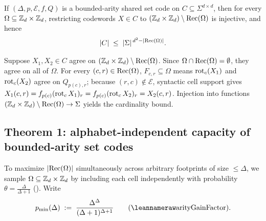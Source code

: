 \begin{lemma}\label{lem:one-hop-injective}
If $(\Delta, p, \mathcal{E}, f, Q)$ is a bounded-arity shared set code on $C \subseteq
\Sigma^{d\times d}$, then for every $\Omega \subseteq \mathbb{Z}_d \times \mathbb{Z}_d$, restricting codewords
$X \in C$ to $(\mathbb{Z}_d \times \mathbb{Z}_d) \setminus \operatorname{Rec}(\Omega)$ is injective, and hence
\[
  \lvert C \rvert \;\le\; \lvert \Sigma \rvert^{\,d^2 - \lvert \operatorname{Rec}(\Omega) \rvert}.
\]
\end{lemma}
\begin{outline}
Suppose $X_1, X_2 \in C$ agree on $(\mathbb{Z}_d \times \mathbb{Z}_d) \setminus \operatorname{Rec}(\Omega)$. Since
$\Omega \cap \operatorname{Rec}(\Omega) = \emptyset$, they agree on all of $\Omega$. For every $(c,r) \in
\operatorname{Rec}(\Omega)$, $F_{c,r} \subseteq \Omega$ means $\operatorname{rot}_c(X_1)$ and $\operatorname{rot}_c(X_2)$ agree on
$Q_{p(c),r}$; because $(r,c) \notin \mathcal{E}$, syntactic cell support gives
$X_1(c,r) = f_{p(c)}(\operatorname{rot}_c X_1)_r = f_{p(c)}(\operatorname{rot}_c X_2)_r = X_2(c,r)$. Injection into functions
$(\mathbb{Z}_d \times \mathbb{Z}_d) \setminus \operatorname{Rec}(\Omega) \to \Sigma$ yields the cardinality bound.
\end{outline}

\subsection{Theorem 1: alphabet-independent capacity of bounded-arity set codes}\label{sec:thm1}

To maximize $\lvert \operatorname{Rec}(\Omega) \rvert$ simultaneously across arbitrary footprints of size $\le \Delta$,
we sample $\Omega \subseteq \mathbb{Z}_d \times \mathbb{Z}_d$ by including each cell independently with probability
$\theta = \frac{\Delta}{\Delta+1}$ (). Write
\[
  p_{\min}(\Delta) \;:=\; \frac{\Delta^\Delta}{(\Delta+1)^{\Delta+1}}
  \qquad (\lean{arityGainFactor}).
\]

